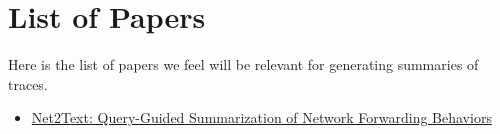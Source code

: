 \section{List of Papers}

Here is the list of papers we feel will be relevant for generating summaries of traces.

\begin{itemize}
    \item \href{https://www.usenix.org/system/files/conference/nsdi18/nsdi18-birkner.pdf}{Net2Text: Query-Guided Summarization of Network Forwarding Behaviors}
\end{itemize}